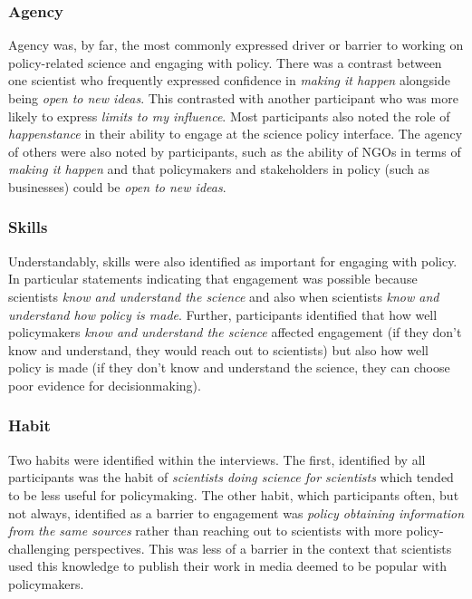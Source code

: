 \subsubsection{Agency}\label{sec:resismagency}
Agency was, by far, the most commonly expressed driver or barrier to working on policy-related science and engaging with policy. There was a contrast between one scientist who frequently expressed confidence in \emph{making it happen} alongside being \emph{open to new ideas}. This contrasted with another participant who was more likely to express \emph{limits to my influence}. Most participants also noted the role of \emph{happenstance} in their ability to engage at the science policy interface. The agency of others were also noted by participants, such as the ability of NGOs in terms of \emph{making it happen} and that policymakers and stakeholders in policy (such as businesses) could be \emph{open to new ideas}.

\subsubsection{Skills}\label{sec:resismskills}
Understandably, skills were also identified as important for engaging with policy. In particular statements indicating that engagement was possible because scientists \emph{know and understand the science} and also when scientists \emph{know and understand how policy is made}. Further, participants identified that how well policymakers \emph{know and understand the science} affected engagement (if they don't know and understand, they would reach out to scientists) but also how well policy is made (if they don't know and understand the science, they can choose poor evidence for decisionmaking).

\subsubsection{Habit}\label{sec:resismhabit}
Two habits were identified within the interviews. The first, identified by all participants was the habit of \emph{scientists doing science for scientists} which tended to be less useful for policymaking. The other habit, which participants often, but not always, identified as a barrier to engagement was \emph{policy obtaining information from the same sources} rather than reaching out to scientists with more policy-challenging perspectives. This was less of a barrier in the context that scientists used this knowledge to publish their work in media deemed to be popular with policymakers.

